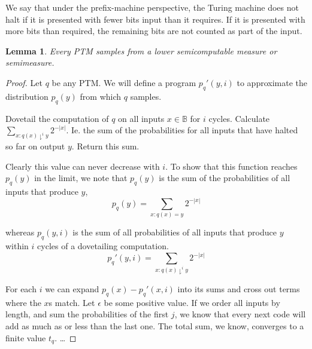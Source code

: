 \documentclass[10pt,a4paper,oneside]{article}
\newtheorem{lma}{Lemma}
\begin{document}
We say that under the prefix-machine perspective, the Turing machine does not halt if it is presented with fewer bits input than it requires. If it is presented with more bits than required, the remaining bits are not counted as part of the input.

\begin{lma}
Every PTM samples from a lower semicomputable measure or semimeasure.
\end{lma}
\begin{proof}
Let $q$ be any PTM. We will define a program $p_q'(y, i)$ to approximate the distribution $p_q(y)$ from which $q$ samples. 

Dovetail the computation of $q$ on all inputs $x \in \mathbb B$ for $i$ cycles. Calculate $\sum_{x : q(x) \downharpoonright^i y}2^{-|x|}$. Ie. the sum of the probabilities for all inputs that have halted so far on output $y$. Return this sum.

Clearly this value can never decrease with $i$. To show that this function reaches $p_q(y)$ in the limit, we note that $p_q(y)$ is the sum of the probabilities of all inputs that produce $y$,
\[
p_q(y) = \sum_{x : q(x) = y} 2^{-|x|}
\] 

whereas $p_q(y, i)$ is the sum of all probabilities of all inputs that produce $y$ within $i$ cycles of a dovetailing computation.
\[
p_q'(y, i) = \sum_{x : q(x) \downharpoonright^i y} 2^{-|x|}
\]

For each $i$ we can expand $p_q(x) - p_q'(x, i)$ into its sums and cross out terms where the $x$s match. Let $\epsilon$ be some positive value. If we order all inputs by length, and sum the probabilities of the first $j$, we know that every next code will add as much as or less than the last one. The total sum, we know, converges to a finite value $t_q$. \ldots
 
\end{proof}
\end{document}
